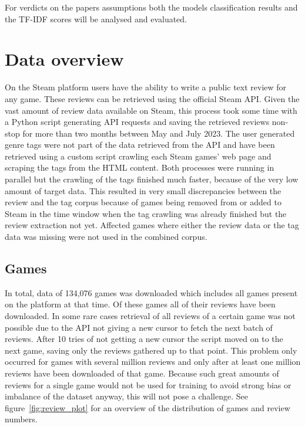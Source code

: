 \documentclass[11pt, a4paper]{article}
\begin{document}
For verdicts on the papers assumptions both the models classification results and the TF-IDF scores will be analysed
and evaluated.


\section{Data overview}\label{sec:data-overview}
On the Steam platform users have the ability to write a public text review for any game.
These reviews can be retrieved using the official Steam API.
Given the vast amount of review data available on Steam, this process took some time with a Python script generating
API requests and saving the retrieved reviews non-stop for more than two months between May and July 2023.
The user generated genre tags were not part of the data retrieved from the API and have been retrieved using a custom
script crawling each Steam games' web page and scraping the tags from the HTML content.
Both processes were running in parallel but the crawling of the tags finished much faster, because of the very low
amount of target data.
This resulted in very small discrepancies between the review and the tag corpus because of games being removed from
or added to Steam in the time window when the tag crawling was already finished but the review extraction not yet.
Affected games where either the review data or the tag data was missing were not used in the combined corpus.

\subsection{Games}\label{subsec:games}
In total, data of 134,076 games was downloaded which includes all games present on the platform at that time.
Of these games all of their reviews have been downloaded.
In some rare cases retrieval of all reviews of a certain game was not possible due to the API not giving a new cursor
to fetch the next batch of reviews.
After 10 tries of not getting a new cursor the script moved on to the next game, saving only the reviews gathered up
to that point.
This problem only occurred for games with several million reviews and only after at least one million reviews have
been downloaded of that game.
Because such great amounts of reviews for a single game would not be used for training to avoid strong bias or
imbalance of the dataset anyway, this will not pose a challenge.
See figure~\ref{fig:review_plot} for an overview of the distribution of games and review numbers.
\end{document}

